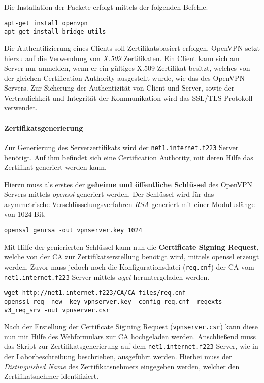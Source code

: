 Die Installation der Packete erfolgt mittels der folgenden Befehle.

\begin{lstlisting}
apt-get install openvpn
apt-get install bridge-utils
\end{lstlisting}

Die Authentifizierung eines Clients soll Zertifikatsbasiert erfolgen. OpenVPN setzt hierzu auf die Verwendung von \emph{X.509} Zertifikaten. Ein Client kann sich am Server nur anmelden, wenn er ein gültiges X.509 Zertifikat besitzt, welches von der gleichen Certification Authority ausgestellt wurde, wie das des OpenVPN-Servers. Zur Sicherung der Authentizität von Client und Server, sowie der Vertraulichkeit und Integrität der Kommunikation wird das SSL/TLS Protokoll verwendet. 

\paragraph{Zertifikatsgenerierung}

Zur Generierung des Serverzertifikats wird der \texttt{net1.internet.f223} Server benötigt. Auf ihm befindet sich eine Certification Authority, mit deren Hilfe das Zertifikat generiert werden kann.

Hierzu muss als erstes der \textbf{geheime und öffentliche Schlüssel} des OpenVPN Servers mittels \emph{openssl} generiert werden. Der Schlüssel wird für das asymmetrische Verschlüsselungsverfahren \emph{RSA} generiert mit einer Moduluslänge von 1024 Bit.

\begin{lstlisting}
openssl genrsa -out vpnserver.key 1024
\end{lstlisting}

Mit Hilfe der genierierten Schlüssel kann nun die \textbf{Certificate Signing Request}, welche von der CA zur Zertifikatserstellung benötigt wird, mittels openssl erzeugt werden. Zuvor muss jedoch noch die Konfigurationsdatei (\texttt{req.cnf}) der CA vom \texttt{net1.internet.f223} Server mittels \emph{wget} heruntergeladen werden.

\begin{lstlisting}
wget http://net1.internet.f223/CA/CA-files/req.cnf
openssl req -new -key vpnserver.key -config req.cnf -reqexts v3_req_srv -out vpnserver.csr
\end{lstlisting}

Nach der Erstellung der Certificate Sigining Request (\texttt{vpnserver.csr}) kann diese nun mit Hilfe des Webformulars zur CA hochgeladen werden.
Anschließend muss das Skript zur Zertifikatsgenerierung auf dem \texttt{net1.internet.f223} Server, wie in der Laborbeschreibung beschrieben, ausgeführt werden. Hierbei muss der \emph{Distinguished Name} des Zertifikatsnehmers eingegeben werden, welcher den Zertifikatsnehmer identifiziert.

